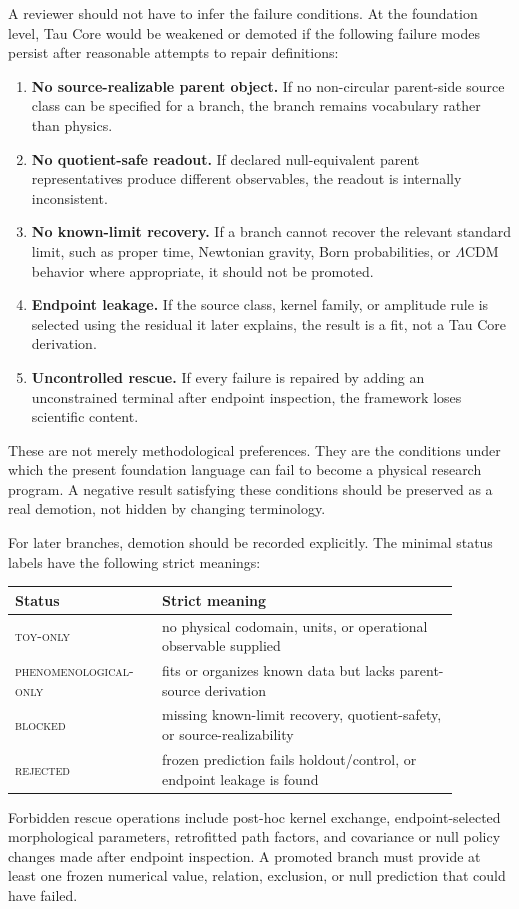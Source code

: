 \documentclass[11pt]{article}
\begin{document}
A reviewer should not have to infer the failure conditions.  At the foundation
level, Tau Core would be weakened or demoted if the following failure modes
persist after reasonable attempts to repair definitions:
\begin{enumerate}[label=(F\arabic*)]
  \item \textbf{No source-realizable parent object.}  If no non-circular
  parent-side source class can be specified for a branch, the branch remains
  vocabulary rather than physics.
  \item \textbf{No quotient-safe readout.}  If declared null-equivalent parent
  representatives produce different observables, the readout is internally
  inconsistent.
  \item \textbf{No known-limit recovery.}  If a branch cannot recover the
  relevant standard limit, such as proper time, Newtonian gravity, Born
  probabilities, or \(\Lambda\)CDM behavior where appropriate, it should not
  be promoted.
  \item \textbf{Endpoint leakage.}  If the source class, kernel family, or
  amplitude rule is selected using the residual it later explains, the result
  is a fit, not a Tau Core derivation.
  \item \textbf{Uncontrolled rescue.}  If every failure is repaired by adding
  an unconstrained terminal after endpoint inspection, the framework
  loses scientific content.
\end{enumerate}

These are not merely methodological preferences.  They are the conditions
under which the present foundation language can fail to become a physical
research program.  A negative result satisfying these conditions should be
preserved as a real demotion, not hidden by changing terminology.

For later branches, demotion should be recorded explicitly.  The minimal status
labels have the following strict meanings:
\begin{center}
\small
\begin{tabular}{L{0.28\linewidth}L{0.60\linewidth}}
\toprule
Status & Strict meaning\\
\midrule
\textsc{toy-only} & no physical codomain, units, or operational observable supplied\\
\textsc{phenomenological-only} & fits or organizes known data but lacks parent-source derivation\\
\textsc{blocked} & missing known-limit recovery, quotient-safety, or source-realizability\\
\textsc{rejected} & frozen prediction fails holdout/control, or endpoint leakage is found\\
\bottomrule
\end{tabular}
\end{center}
Forbidden rescue operations include post-hoc kernel exchange, endpoint-selected
morphological parameters, retrofitted path factors, and covariance or null
policy changes made after endpoint inspection.  A promoted branch must provide
at least one frozen numerical value, relation, exclusion, or null prediction
that could have failed.
\end{document}

